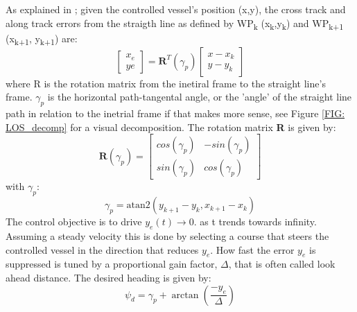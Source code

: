 As explained in \cite{lekkas2013line}; given the controlled vessel's position (x,y), the cross track and along track errors from the straigth line as defined by WP\textsubscript{k} (x\textsubscript{k},y\textsubscript{k})
and WP\textsubscript{k+1} (x\textsubscript{k+1}, y\textsubscript{k+1}) are:
\begin{equation}\label{EQ: cross and along track error} %
    \begin{bmatrix}
        x_e \\[-5pt]
         ye
    \end{bmatrix} = \textbf{R}^T(\gamma_p) \begin{bmatrix}
                                            x - x_k \\[-5pt]
                                            y - y_k
                                            \end{bmatrix}
\end{equation}
where R is the rotation matrix from the inetiral frame to the straight line's frame. $\gamma_p$ is the horizontal path-tangental angle,
or the 'angle' of the straight line path in relation to the inetrial frame if that makes more sense, see Figure \ref{FIG: LOS_decomp} for a visual
decomposition. The rotation matrix \textbf{R} is given by:
\begin{equation} %
    \textbf{R}(\gamma_p) = \begin{bmatrix}
                            cos(\gamma_p) & -sin(\gamma_p) \\[-5pt]
                            sin(\gamma_p) & cos(\gamma_p)
                            \end{bmatrix}
\end{equation}
with $\gamma_p$:
\begin{equation} %
    \gamma_p = \textrm{atan2}(y_{k+1} - y_k , x_{k+1} - x_k)
\end{equation}
The control objective is to drive $y_{e}(t) \rightarrow 0.$ as t trends towards infinity. Assuming a steady velocity this is done by
selecting a course that steers the controlled vessel in the direction that reduces $y_e$. How fast the error $y_e$ is suppressed is
tuned by a proportional gain factor, $\varDelta$, that is often called look ahead distance. The desired heading is given by:
\begin{equation} %
    \psi_d = \gamma_p + \arctan(\frac{-y_e}{\varDelta})
\end{equation}
